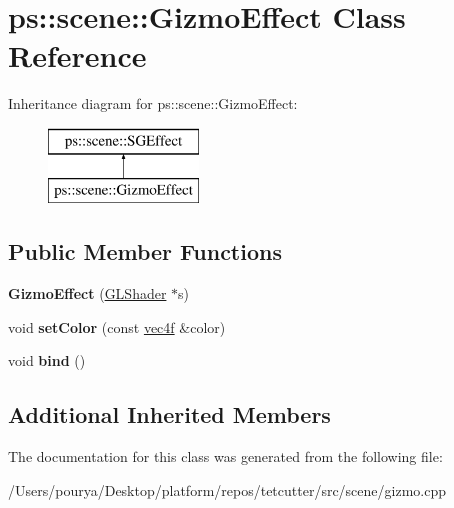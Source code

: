 \hypertarget{classps_1_1scene_1_1GizmoEffect}{}\section{ps\+:\+:scene\+:\+:Gizmo\+Effect Class Reference}
\label{classps_1_1scene_1_1GizmoEffect}
Inheritance diagram for ps\+:\+:scene\+:\+:Gizmo\+Effect\+:\begin{figure}[H]
\begin{center}
\leavevmode
\includegraphics[height=2.000000cm]{classps_1_1scene_1_1GizmoEffect}
\end{center}
\end{figure}
\subsection*{Public Member Functions}
\begin{DoxyCompactItemize}
\item 
\hypertarget{classps_1_1scene_1_1GizmoEffect_a8b11c9fcc2117ad66d054ea3d3ecb469}{}{\bfseries Gizmo\+Effect} (\hyperlink{classps_1_1opengl_1_1GLShader}{G\+L\+Shader} $\ast$s)\label{classps_1_1scene_1_1GizmoEffect_a8b11c9fcc2117ad66d054ea3d3ecb469}

\item 
\hypertarget{classps_1_1scene_1_1GizmoEffect_a9afa3aa81d4f8077684a08aa945aa16d}{}void {\bfseries set\+Color} (const \hyperlink{classps_1_1base_1_1Vec4}{vec4f} \&color)\label{classps_1_1scene_1_1GizmoEffect_a9afa3aa81d4f8077684a08aa945aa16d}

\item 
\hypertarget{classps_1_1scene_1_1GizmoEffect_a8bcd44e759c32386b5835dc2fe5f927e}{}void {\bfseries bind} ()\label{classps_1_1scene_1_1GizmoEffect_a8bcd44e759c32386b5835dc2fe5f927e}

\end{DoxyCompactItemize}
\subsection*{Additional Inherited Members}


The documentation for this class was generated from the following file\+:\begin{DoxyCompactItemize}
\item 
/\+Users/pourya/\+Desktop/platform/repos/tetcutter/src/scene/gizmo.\+cpp\end{DoxyCompactItemize}
